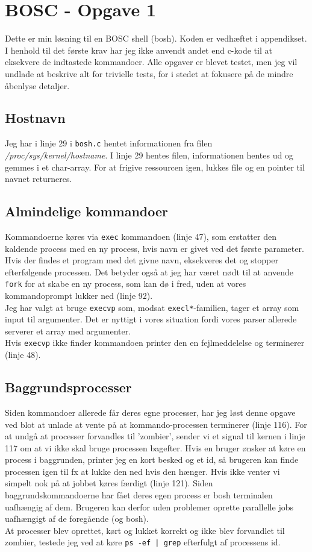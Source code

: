 \documentclass{article}
\begin{document}
\section*{BOSC - Opgave 1}
Dette er min løsning til en BOSC shell (bosh). Koden er vedhæftet i appendikset. I henhold til det første krav har jeg ikke anvendt andet end c-kode til at eksekvere de indtastede kommandoer. Alle opgaver er blevet testet, men jeg vil undlade at beskrive alt for trivielle tests, for i stedet at fokusere på de mindre åbenlyse detaljer.

\subsection*{Hostnavn}
Jeg har i linje 29 i \texttt{bosh.c} hentet informationen fra filen \textit{/proc/sys/kernel/hostname}. I linje 29 hentes filen, informationen
hentes ud og gemmes i et char-array. For at frigive ressourcen igen, lukkes file og en pointer til navnet returneres.

\subsection*{Almindelige kommandoer}
Kommandoerne køres via \texttt{exec} kommandoen (linje 47), som erstatter den kaldende process med en ny process, hvis navn er givet ved det første parameter. Hvis der findes et program med det givne navn, eksekveres det og stopper efterfølgende processen. Det betyder også at jeg har været nødt til at anvende \texttt{fork} for at skabe en ny process, som kan dø i fred, uden at vores kommandoprompt lukker ned (linje 92). \\

Jeg har valgt at bruge \texttt{execvp} som, modsat \texttt{execl*}-familien, tager et array som input til argumenter. Det er nyttigt i vores situation fordi vores parser allerede serverer et array med argumenter. \\

Hvis \texttt{execvp} ikke finder kommandoen printer den en fejlmeddelelse og terminerer (linje 48).

\subsection*{Baggrundsprocesser}
Siden kommandoer allerede får deres egne processer, har jeg løst denne opgave ved blot at unlade at vente på at kommando-processen terminerer (linje 116). For at undgå at processer forvandles til 'zombier', sender vi et signal til kernen i linje 117 om at vi ikke skal bruge processen bagefter. Hvis en bruger ønsker at køre en process i baggrunden, printer jeg en kort besked og et id, så brugeren kan finde processen igen til fx at lukke den ned hvis den hænger. Hvis ikke venter vi simpelt nok på at jobbet køres færdigt (linje 121). Siden baggrundskommandoerne har fået deres egen process er bosh terminalen uafhængig af dem. Brugeren kan derfor uden problemer oprette parallelle jobs uafhængigt af de foregående (og bosh). \\
At processer blev oprettet, kørt og lukket korrekt og ikke blev forvandlet til zombier, testede jeg ved at køre \texttt{ps -ef | grep} efterfulgt af processens id.
\end{document}
